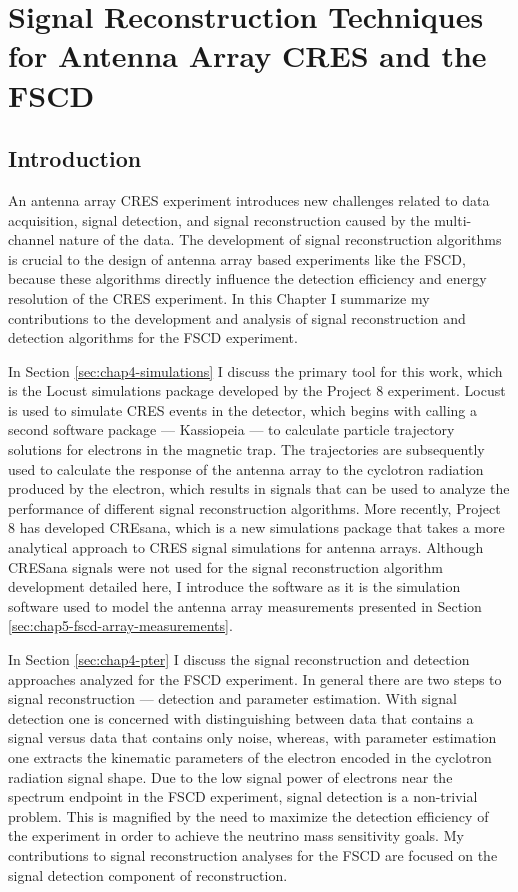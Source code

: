 \chapter{Signal Reconstruction Techniques for Antenna Array CRES and the FSCD}

\section{Introduction}

An antenna array CRES experiment introduces new challenges related to data acquisition, signal detection, and signal reconstruction caused by the multi-channel nature of the data. The development of signal reconstruction algorithms is crucial to the design of antenna array based experiments like the FSCD, because these algorithms directly influence the detection efficiency and energy resolution of the CRES experiment. In this Chapter I summarize my contributions to the development and analysis of signal reconstruction and detection algorithms for the FSCD experiment.

In Section \ref{sec:chap4-simulations} I discuss the primary tool for this work, which is the Locust simulations package developed by the Project 8 experiment. Locust is used to simulate CRES events in the detector, which begins with calling a second software package --- Kassiopeia --- to calculate particle trajectory solutions for electrons in the magnetic trap. The trajectories are subsequently used to calculate the response of the antenna array to the cyclotron radiation produced by the electron, which results in signals that can be used to analyze the performance of different signal reconstruction algorithms. More recently, Project 8 has developed CREsana, which is a new simulations package that takes a more analytical approach to CRES signal simulations for antenna arrays. Although CRESana signals were not used for the signal reconstruction algorithm development detailed here, I introduce the software as it is the simulation software used to model the antenna array measurements presented in Section \ref{sec:chap5-fscd-array-measurements}.

In Section \ref{sec:chap4-pter} I discuss the signal reconstruction and detection approaches analyzed for the FSCD experiment. In general there are two steps to signal reconstruction --- detection and parameter estimation. With signal detection one is concerned with distinguishing between data that contains a signal versus data that contains only noise, whereas, with parameter estimation one extracts the kinematic parameters of the electron encoded in the cyclotron radiation signal shape. Due to the low signal power of electrons near the spectrum endpoint in the FSCD experiment, signal detection is a non-trivial problem. This is magnified by the need to maximize the detection efficiency of the experiment in order to achieve the neutrino mass sensitivity goals. My contributions to signal reconstruction analyses for the FSCD are focused on the signal detection component of reconstruction.

